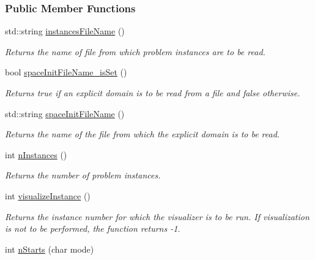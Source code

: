 \subsubsection*{Public Member Functions}
\begin{DoxyCompactItemize}
\item 
std\+::string \hyperlink{structslb_1_1core_1_1commandLine_1_1CommandLine_a409b982608d4f5b33db36dd951be94aa}{instances\+File\+Name} ()
\begin{DoxyCompactList}\small\item\em Returns the name of file from which problem instances are to be read. \end{DoxyCompactList}\item 
bool \hyperlink{structslb_1_1core_1_1commandLine_1_1CommandLine_a722e8598fd3bacf7b7c043570761f505}{space\+Init\+File\+Name\+\_\+is\+Set} ()
\begin{DoxyCompactList}\small\item\em Returns {\ttfamily true} if an explicit domain is to be read from a file and {\ttfamily false} otherwise. \end{DoxyCompactList}\item 
std\+::string \hyperlink{structslb_1_1core_1_1commandLine_1_1CommandLine_a516622ca0df35c3cebc2f58d9cf8f6cc}{space\+Init\+File\+Name} ()
\begin{DoxyCompactList}\small\item\em Returns the name of the file from which the explicit domain is to be read. \end{DoxyCompactList}\item 
int \hyperlink{structslb_1_1core_1_1commandLine_1_1CommandLine_a6158f28b2570a978155cc404f6f7d053}{n\+Instances} ()
\begin{DoxyCompactList}\small\item\em Returns the number of problem instances. \end{DoxyCompactList}\item 
int \hyperlink{structslb_1_1core_1_1commandLine_1_1CommandLine_a898532baa7038c47f17de8390d50459f}{visualize\+Instance} ()
\begin{DoxyCompactList}\small\item\em Returns the instance number for which the visualizer is to be run. If visualization is not to be performed, the function returns -\/1. \end{DoxyCompactList}\item 
int \hyperlink{structslb_1_1core_1_1commandLine_1_1CommandLine_a2ae1702ab278a15945e753b3097fcad4}{n\+Starts} (char mode)

\end{DoxyCompactItemize}
